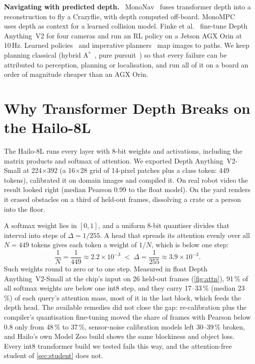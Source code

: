 \documentclass[conference]{IEEEtran}
\newcommand{\hailo}{Hailo-8L}
\newcommand{\dav}{Depth Anything~V2}
\newcommand{\keyline}[1]{\smallskip\noindent\textbf{#1}\ }
\begin{document}
\keyline{Navigating with predicted depth.} MonoNav~\cite{simon2023mononav} fuses transformer depth into a reconstruction to
fly a Crazyflie, with depth computed off-board. MonoMPC~\cite{sharma2026monompc} uses depth as context for a learned
collision model. Finke et al.~\cite{finke2026omninav} fine-tune \dav{} for four cameras and run an RL policy on a Jetson AGX
Orin at 10\,Hz. Learned policies~\cite{shah2023vint,sridhar2024nomad} and imperative planners~\cite{yang2023iplanner,roth2024viplanner}
map images to paths. We keep planning classical (hybrid A$^\ast$~\cite{dolgov2010hybrid}, pure
pursuit~\cite{coulter1992purepursuit}) so that every failure can be attributed to perception, planning or localisation, and
run all of it on a board an order of magnitude cheaper than an AGX Orin.

\section{Why Transformer Depth Breaks on the Hailo-8L}\label{sec:int8}
The \hailo{} runs every layer with 8-bit weights and activations, including the matrix products and softmax of attention.
We exported \dav-Small at 224$\times$392 (a 16$\times$28 grid of 14-pixel patches plus a class token: 449 tokens),
calibrated it on domain images and compiled it. On real robot video the result looked right (median Pearson 0.99 to the
float model). On the yard renders it erased obstacles on a third of held-out frames, dissolving a crate or a person into the
floor.

A softmax weight lies in $[0,1]$, and a uniform 8-bit quantiser divides that interval into steps of
$\Delta=1/255$. A head that spreads its attention evenly over all $N=449$ tokens gives each token a weight of $1/N$, which is
below one step:
\begin{equation}
\frac{1}{N}=\frac{1}{449}\approx2.2\times10^{-3}\;<\;\Delta=\frac{1}{255}\approx3.9\times10^{-3}.
\end{equation}
Such weights round to zero or to one step. Measured in float
\dav-Small at the chip's input on 26 held-out frames (\cref{fig:attn}), 91\,\% of all softmax weights are below one int8
step, and they carry 17--33\,\% (median 23\,\%) of each query's attention mass, most of it in the last block, which feeds
the depth head. The available remedies did not close the gap: re-calibration plus the compiler's quantisation fine-tuning
moved the share of frames with Pearson below 0.8 only from 48\,\% to 37\,\%, sensor-noise calibration models left
30--39\,\% broken, and Hailo's own Model Zoo build shows the same blockiness and object loss. Every int8 transformer build
we tested fails this way, and the attention-free student of \cref{sec:student} does not.
\end{document}
